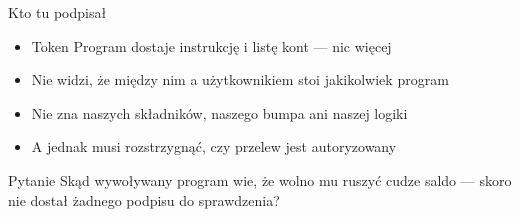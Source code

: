 \begin{frame}{Kto tu podpisał}
  \begin{itemize}
    \item Token Program dostaje instrukcję i listę kont --- nic więcej
    \item Nie widzi, że między nim a użytkownikiem stoi jakikolwiek program
    \item Nie zna naszych składników, naszego bumpa ani naszej logiki
    \item A jednak musi rozstrzygnąć, czy przelew jest autoryzowany
  \end{itemize}
  \vspace{0.25cm}
  \begin{alertblock}{Pytanie}
    Skąd wywoływany program wie, że wolno mu ruszyć cudze saldo ---
    skoro nie dostał żadnego podpisu do sprawdzenia?
  \end{alertblock}
\end{frame}

